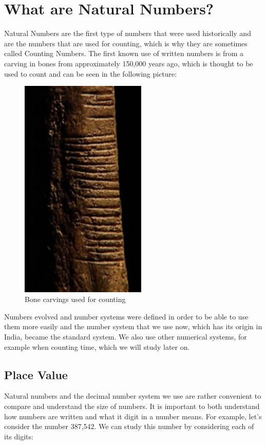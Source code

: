 \documentclass[11pt, oneside]{article}
\theoremstyle{definition}
\begin{document}
\section{What are Natural Numbers?}

Natural Numbers are the first type of numbers that were used historically and are the numbers that are used for counting, which is why they are sometimes called Counting Numbers. The first known use of written numbers is from a carving in bones from approximately 150,000 years ago, which is thought to be used to count and can be seen in the following picture:

\begin{figure}[ht!]
\centering
\includegraphics[width=60mm]{bone-carving.jpg}
\caption{Bone carvings used for counting \label{overflow}}
\end{figure}

Numbers evolved and number systems were defined in order to be able to use them more easily and the number system that we use now, which has its origin in India, became the standard system. We also use other numerical systems, for example when counting time, which we will study later on. 

\subsection{Place Value}

Natural numbers and the decimal number system we use are rather convenient to compare and understand the size of numbers. It is important to both understand how numbers are written and what it digit in a number means. For example, let's consider the number 387,542. We can study this number by considering each of its digits:
\end{document}
